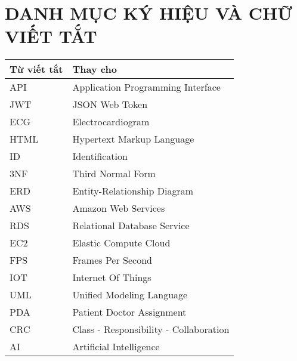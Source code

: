 


\clearpage
\pagestyle{empty} %
{}
\tableofcontents %

\clearpage
\pagestyle{plain} %

\cleardoublepage

\section*{DANH MỤC KÝ HIỆU VÀ CHỮ VIẾT TẮT}%

\begin{table}[H]
  \centering
  \begin{tabularx}{0.85\textwidth}{
  | >{\centering\arraybackslash}m{3cm}
  | >{\centering\arraybackslash}X|
  }
  \hline
  \bfseries Từ viết tắt     &\bfseries Thay cho\hspace{1cm}\\ \hline
  API     & Application Programming Interface \\ \hline
  JWT  & JSON Web Token \\ \hline
  ECG   & Electrocardiogram \\ \hline
  HTML   & Hypertext Markup Language \\ \hline
  ID    & Identification \\ \hline
  3NF   & Third Normal Form \\ \hline
  ERD     & Entity-Relationship Diagram \\ \hline
  AWS  & Amazon Web Services \\ \hline
  RDS   & Relational Database Service \\ \hline
  EC2   & Elastic Compute Cloud \\ \hline
  FPS   & Frames Per Second \\ \hline
  IOT   & Internet Of Things \\ \hline
  UML   & Unified Modeling Language \\ \hline
  PDA   & Patient Doctor Assignment \\ \hline
  CRC   & Class - Responsibility - Collaboration \\ \hline
  AI   & Artificial Intelligence \\ \hline



  
  \end{tabularx}
\end{table}
\cleardoublepage


